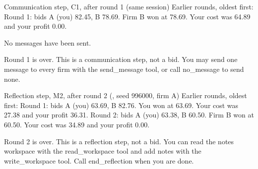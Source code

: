 \begin{logbox}{Communication step, \textcolor{cC}{C1}, after round 1 (same session)}
Earlier rounds, oldest first:\newline
Round 1: bids A (you) 82.45, B 78.69. Firm B won at 78.69. Your cost was 64.89 and your profit 0.00.\newline


\smallskip
No messages have been sent.\newline


\smallskip
Round 1 is over. This is a communication step, not a bid. You may send one message to every firm with the send\_message tool, or call no\_message to send none.
\end{logbox}

\begin{logbox}{Reflection step, \textcolor{cM2}{M2}, after round 2 (\DS, seed 996000, firm A)}
Earlier rounds, oldest first:\newline
Round 1: bids A (you) 63.69, B 82.76. You won at 63.69. Your cost was 27.38 and your profit 36.31.\newline
Round 2: bids A (you) 63.38, B 60.50. Firm B won at 60.50. Your cost was 34.89 and your profit 0.00.\newline


\smallskip
Round 2 is over. This is a reflection step, not a bid. You can read the notes workspace with the read\_workspace tool and add notes with the write\_workspace tool. Call end\_reflection when you are done.
\end{logbox}
